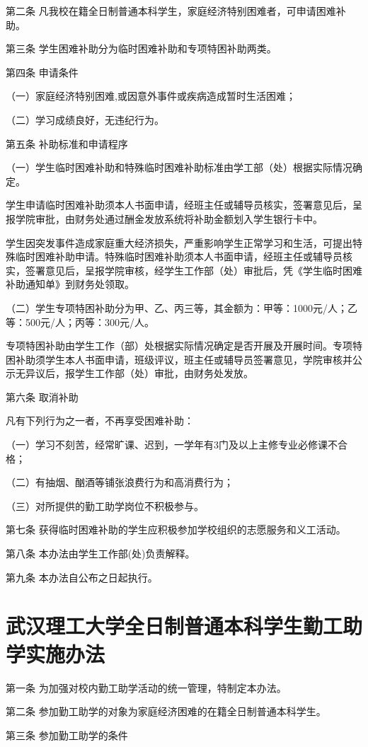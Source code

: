 \documentclass[UTF8,12pt,a4paper]{report}
\begin{document}
第二条 凡我校在籍全日制普通本科学生，家庭经济特别困难者，可申请困难补助。

第三条 学生困难补助分为临时困难补助和专项特困补助两类。

第四条 申请条件

（一）家庭经济特别困难,或因意外事件或疾病造成暂时生活困难；

（二）学习成绩良好，无违纪行为。

第五条 补助标准和申请程序

（一）学生临时困难补助和特殊临时困难补助标准由学工部（处）根据实际情况确定。

学生申请临时困难补助须本人书面申请，经班主任或辅导员核实，签署意见后，呈报学院审批，由财务处通过酬金发放系统将补助金额划入学生银行卡中。

学生因突发事件造成家庭重大经济损失，严重影响学生正常学习和生活，可提出特殊临时困难补助申请。特殊临时困难补助须本人书面申请，经班主任或辅导员核实，签署意见后，呈报学院审核，经学生工作部（处）审批后，凭《学生临时困难补助通知单》到财务处领取。

（二）学生专项特困补助分为甲、乙、丙三等，其金额为：甲等：1000元/人；乙等：500元/人；丙等：300元/人。

专项特困补助由学生工作（部）处根据实际情况确定是否开展及开展时间。专项特困补助须学生本人书面申请，班级评议，班主任或辅导员签署意见，学院审核并公示无异议后，报学生工作部（处）审批，由财务处发放。

第六条 取消补助

凡有下列行为之一者，不再享受困难补助：

（一）学习不刻苦，经常旷课、迟到，一学年有3门及以上主修专业必修课不合格；

（二）有抽烟、酗酒等铺张浪费行为和高消费行为；

（三）对所提供的勤工助学岗位不积极参与。

第七条 获得临时困难补助的学生应积极参加学校组织的志愿服务和义工活动。

第八条 本办法由学生工作部(处)负责解释。

第九条 本办法自公布之日起执行。

\chapter{武汉理工大学全日制普通本科学生勤工助学实施办法}
第一条 为加强对校内勤工助学活动的统一管理，特制定本办法。

第二条 参加勤工助学的对象为家庭经济困难的在籍全日制普通本科学生。

第三条 参加勤工助学的条件
\end{document}
